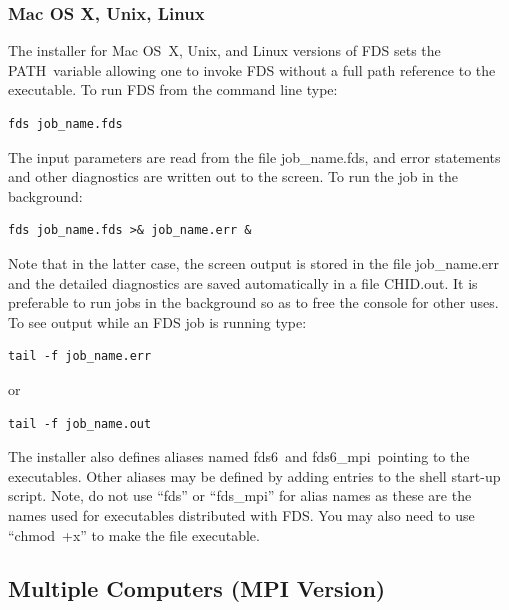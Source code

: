 \documentclass[11pt]{book}
\begin{document}
\subsubsection{Mac OS X, Unix, Linux}

The installer for Mac OS~X, Unix, and Linux versions of FDS sets the {\ct PATH}\ variable allowing one to invoke FDS without a full path reference to the executable.  To run FDS from the command line type:
\begin{lstlisting}
fds job_name.fds
\end{lstlisting}
The input parameters are read from the file {\ct job\_name.fds}, and error statements and other diagnostics are written out to the screen. To run the job in the background:
\begin{lstlisting}
fds job_name.fds >& job_name.err &
\end{lstlisting}
Note that in the latter case, the screen output is stored in the file {\ct job\_name.err} and the detailed diagnostics are saved automatically in a file {\ct CHID.out}. It is preferable to run jobs in the background so as to free the console for other uses. To see output while an
FDS job is running type:
\begin{lstlisting}
tail -f job_name.err
\end{lstlisting}
or
\begin{lstlisting}
tail -f job_name.out
\end{lstlisting}
The installer also defines aliases named {\ct fds6}\ and {\ct fds6\_mpi}\ pointing to the executables. Other aliases may be defined by adding entries to the shell start-up script. Note, do not use ``{\ct fds}'' or ``{\ct fds\_mpi}'' for alias names as these are the names used for executables distributed with FDS. You may also need to use ``chmod~+x'' to make the file executable.


\subsection{Multiple Computers (MPI Version)}
\label{info:parallelprocessing}
\end{document}
